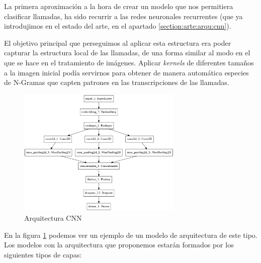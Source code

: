 La primera aproximación a la hora de crear un modelo que nos permitiera clasificar llamadas, ha sido recurrir a las redes neuronales recurrentes (que ya introdujimos en el estado del arte, en el apartado \ref{section:arte:arqu:cnn}). 

El objetivo principal que perseguimos al aplicar esta estructura era poder capturar la estructura local de las llamadas, de una forma similar al modo en el que se hace en el tratamiento de imágenes. Aplicar \textit{kernels} de diferentes tamaños a la imagen inicial podía servirnos para obtener de manera automática especies de N-Gramas  que capten patrones en las transcripciones de las llamadas. 

\begin{figure}[!ht]
	\centering
	\includegraphics[width=0.7\textwidth]{images/super/arq_cnn}
	\caption{Arquitectura CNN}
	\label{fig:arqcnn}
\end{figure}


En la figura \ref{fig:arqcnn} podemos ver un ejemplo de un modelo de arquitectura de este tipo. Los modelos con la arquitectura que proponemos estarán formados por los siguientes tipos de capas: 

